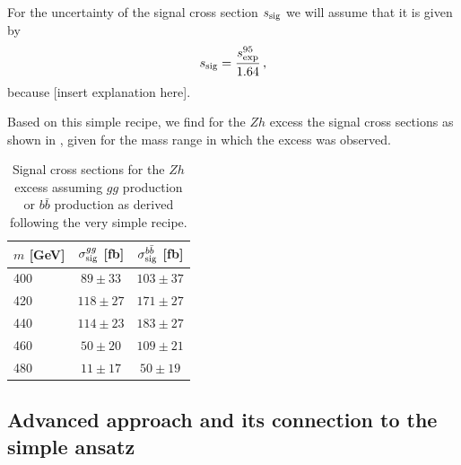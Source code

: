 \documentclass[12pt]{article}
\begin{document}
\begin{appendices}
For the uncertainty of the signal cross section $s_{\rm sig}$
we will assume that it is given by
\begin{equation}
s_{\rm sig} = \frac{s_{\rm exp}^{95}}{1.64} \, ,
\end{equation}
because [insert explanation here].

Based on this simple recipe, we find for the $Zh$ excess the
signal cross sections as shown in , given for the
mass range in which the excess was observed.
\begin{table}
\centering
\begin{tabular}{l|cc}
$m$ [GeV] & $\sigma_{\rm sig}^{gg}$ [fb] & $\sigma_{\rm sig}^{b \bar b}$ [fb] \\
\hline
400 & $ 89 \pm 33$ & $103 \pm 37$ \\
420 & $118 \pm 27$ & $171 \pm 27$ \\
440 & $114 \pm 23$ & $183 \pm 27$ \\
460 & $ 50 \pm 20$ & $109 \pm 21$ \\
480 & $ 11 \pm 17$ & $ 50 \pm 19$
\end{tabular}
\caption{Signal cross sections for the $Zh$ excess assuming $gg$ production
or $b \bar b$ production as derived following the very simple recipe.}
\label{zhsimple}
\end{table}



\subsection{Advanced approach and its connection to the simple ansatz}


\end{appendices}
\end{document}

